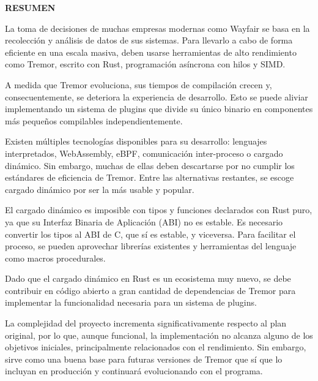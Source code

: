 
\begin{center}
{\LARGE \bfseries RESUMEN}

\vspace{2.5cm}
\end{center}

La toma de decisiones de muchas empresas modernas como Wayfair se basa en la
recolección y análisis de datos de sus sistemas. Para llevarlo a cabo de forma
eficiente en una escala masiva, deben usarse herramientas de alto rendimiento
como Tremor, escrito con Rust, programación asíncrona con hilos y SIMD.

A medida que Tremor evoluciona, sus tiempos de compilación crecen y,
consecuentemente, se deteriora la experiencia de desarrollo. Esto se puede
aliviar implementando un sistema de plugins que divide su único binario en
componentes más pequeños compilables independientemente.

Existen múltiples tecnologías disponibles para su desarrollo: lenguajes
interpretados, WebAssembly, eBPF, comunicación inter-proceso o cargado dinámico.
Sin embargo, muchas de ellas deben descartarse por no cumplir los estándares de
eficiencia de Tremor. Entre las alternativas restantes, se escoge cargado
dinámico por ser la más usable y popular.

El cargado dinámico es imposible con tipos y funciones declarados con Rust puro,
ya que su Interfaz Binaria de Aplicación (ABI) no es estable. Es necesario
convertir los tipos al ABI de C, que sí es estable, y viceversa. Para facilitar
el proceso, se pueden aprovechar librerías existentes y herramientas del
lenguaje como macros procedurales.

Dado que el cargado dinámico en Rust es un ecosistema muy nuevo, se debe
contribuir en código abierto a gran cantidad de dependencias de Tremor para
implementar la funcionalidad necesaria para un sistema de plugins.

La complejidad del proyecto incrementa significativamente respecto al plan
original, por lo que, aunque funcional, la implementación no alcanza alguno de
los objetivos iniciales, principalmente relacionados con el rendimiento. Sin
embargo, sirve como una buena base para futuras versiones de Tremor que sí que
lo incluyan en producción y continuará evolucionando con el programa.
